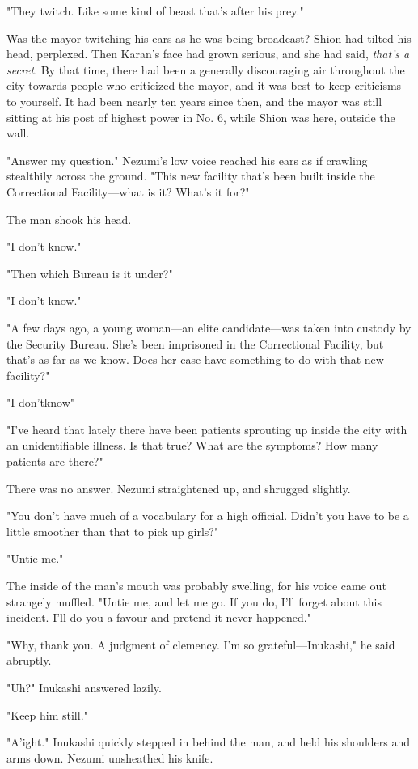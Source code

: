 "They twitch. Like some kind of beast that's after his prey."

Was the mayor twitching his ears as he was being broadcast? Shion had
tilted his head, perplexed. Then Karan's face had grown serious, and she
had said, \emph{that's a secret}. By that time, there had been a generally
discouraging air throughout the city towards people who criticized the
mayor, and it was best to keep criticisms to yourself. It had been
nearly ten years since then, and the mayor was still sitting at his post
of highest power in No. 6, while Shion was here, outside the wall.

"Answer my question." Nezumi's low voice reached his ears as if crawling
stealthily across the ground. "This new facility that's been built
inside the Correctional Facility---what is it? What's it for?"

The man shook his head.

"I don't know."

"Then which Bureau is it under?"

"I don't know."

"A few days ago, a young woman---an elite candidate---was taken into custody
by the Security Bureau. She's been imprisoned in the Correctional
Facility, but that's as far as we know. Does her case have something to
do with that new facility?"

"I don't\el know\el "

"I've heard that lately there have been patients sprouting up inside the
city with an unidentifiable illness. Is that true? What are the
symptoms? How many patients are there?"

There was no answer. Nezumi straightened up, and shrugged slightly.

"You don't have much of a vocabulary for a high official. Didn't you
have to be a little smoother than that to pick up girls?"

"Untie me."

The inside of the man's mouth was probably swelling, for his voice came
out strangely muffled. "Untie me, and let me go. If you do, I'll forget
about this incident. I'll do you a favour and pretend it never
happened."

"Why, thank you. A judgment of clemency. I'm so grateful---Inukashi," he
said abruptly.

"Uh?" Inukashi answered lazily.

"Keep him still."

"A'ight." Inukashi quickly stepped in behind the man, and held his
shoulders and arms down. Nezumi unsheathed his knife.

